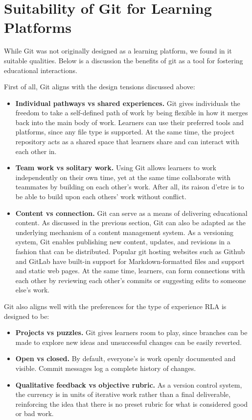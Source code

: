 \documentclass[12pt,twoside]{mitthesis}
\newcommand{\draft}[1]{{\color{blue} #1}}
\begin{document}
\section{Suitability of Git for Learning Platforms}

\draft{While Git was not originally designed as a learning platform, we found in it suitable qualities. Below is a discussion the benefits of git as a tool for fostering educational interactions.

First of all, Git aligns with the design tensions discussed above: 
\begin{itemize}
\item \textbf{Individual pathways vs shared experiences.} Git gives individuals the freedom to take a self-defined path of work by being flexible in how it merges back into the main body of work. Learners can use their preferred tools and platforms, since any file type is supported. At the same time, the project repository acts as a shared space that learners share and can interact with each other in.
\item \textbf{Team work vs solitary work.} Using Git allows learners to work independently on their own time, yet at the same time collaborate with teammates by building on each other's work. After all, its raison d'etre is to be able to build upon each others' work without conflict.
\item \textbf{Content vs connection.} Git can serve as a means of delivering educational content. As discussed in the previous section, Git can also be adapted as the underlying mechanism of a content management system. As a versioning system, Git enables publishing new content, updates, and revisions in a fashion that can be distributed. Popular git hosting websites such as Github and GitLab have built-in support for Markdown-formatted files and support and static web pages. At the same time, learners, can form connections with each other by reviewing each other's commits or suggesting edits to someone else's work. 
\end{itemize}

Git also aligns well with the preferences for the type of experience RLA is designed to be:
\begin{itemize}
\item \textbf{Projects vs puzzles.} Git gives learners room to play, since branches can be made to explore new ideas and unsuccessful changes can be easily reverted.  
\item \textbf{Open vs closed.} By default, everyone's is work openly documented and visible. Commit messages log a complete history of changes.
\item \textbf{Qualitative feedback vs objective rubric.} As a version control system, the currency is in units of iterative work rather than a final deliverable, reinforcing the idea that there is no preset rubric for what is considered good or bad work.
\end{itemize}

}
\end{document}
